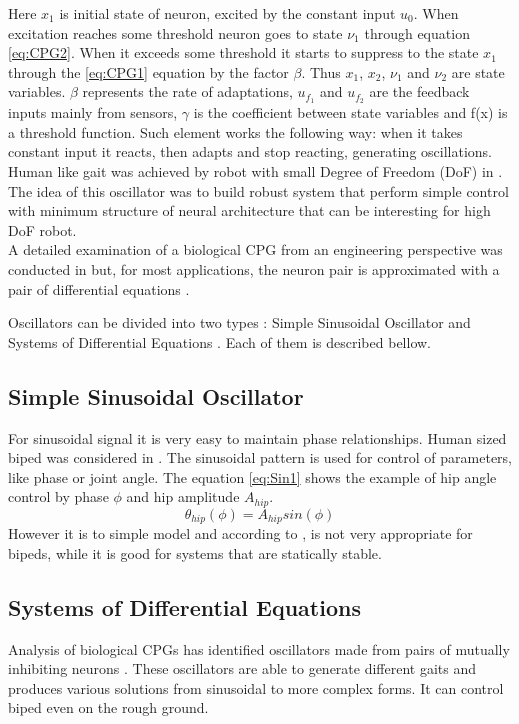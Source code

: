 \documentclass[12pt,a4paper]{report}
\begin{document}
		Here $x_1$  is initial state of neuron, excited by the constant input $u_0$. When excitation reaches some threshold neuron goes to state $\nu_1$ through equation \ref{eq:CPG2}. When it exceeds some threshold it starts to suppress to the state $x_1$ through the \ref{eq:CPG1} equation by the factor $\beta$. Thus $x_1$, $x_2$, $\nu_1$ and $\nu_2$ are state variables. $\beta$ represents the rate of adaptations, $u_{f_1}$ and $u_{f_2}$ are the feedback inputs mainly from sensors, $\gamma$ is the coefficient between state variables and f(x) is a threshold function. Such element works the following way: when it takes constant input it reacts, then adapts and stop reacting, generating oscillations. \\ Human like gait was achieved by robot with small Degree of Freedom (DoF) in \cite{miyakoshi1998three}. The idea of this oscillator was to build robust system that perform simple control with minimum structure of neural architecture that can be interesting for high DoF robot.\\
		A detailed examination of a biological CPG from an engineering perspective was conducted in \cite{zhu2006central} but, for most applications, the neuron pair is approximated with a pair of differential equations \cite{wright2014intelligent}.

		Oscillators can be divided into two types : Simple Sinusoidal Oscillator and Systems of Differential Equations \cite{wright2014intelligent}. Each of them is described bellow.

		\subsection{Simple Sinusoidal Oscillator}
			For sinusoidal signal it is very easy to maintain phase relationships. Human sized biped was considered in \cite{morimoto2008biologically}. The sinusoidal pattern is used for control of parameters, like phase or joint angle. The equation \ref{eq:Sin1} shows the example of hip angle control by phase $\phi$ and hip amplitude $A_{hip}$.
			\begin{equation}\label{eq:Sin1}
				\theta_{hip} (\phi) = A_{hip} sin(\phi) 
			\end{equation}
 			However it is to simple model and according to \cite{wright2014intelligent}, is not very appropriate for bipeds, while it is good for systems that are statically stable. 
		\subsection{Systems of Differential Equations}
			Analysis of biological CPGs has identified oscillators made from pairs of mutually inhibiting neurons \cite{grillner1995neural}. These oscillators are able to generate different gaits and produces various solutions from sinusoidal to more complex forms. It can control biped even on the rough ground.
\end{document}
